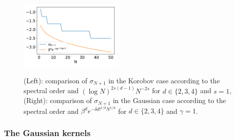\documentclass[twoside,11pt]{book}
\numberwithin{theorem}{chapter}
\numberwithin{definition}{chapter}
\numberwithin{proposition}{chapter}
\numberwithin{corollary}{chapter}
\numberwithin{example}{chapter}
\numberwithin{lemma}{chapter}
\numberwithin{assumption}{chapter}
\DeclareMathOperator{\Tran}{\intercal}
\DeclareMathOperator{\X}{\mathcal{X}}
\begin{document}
\begin{figure}[]
\includegraphics[width= 0.45\textwidth]{img/neurips/multiHermite/comparison/Gaussian_4D_scale_1_eig_comparison.pdf}
\\
\caption{(Left): comparison of $\sigma_{N+1}$ in the Korobov case according to the spectral order and $(\log N)^{2s(d-1)}N^{-2s}$ for $d \in \{2,3,4\}$ and $s=1$, (Right): comparison of $\sigma_{N+1}$ in the Gaussian case according to the spectral order and $\beta^{d}e^{-\delta d!^{1/d}N^{1/d}}$ for $d \in \{2,3,4\}$ and $\gamma = 1$.}
\label{f:rates}
\end{figure}

\subsubsection{The Gaussian kernels}







\end{document}
